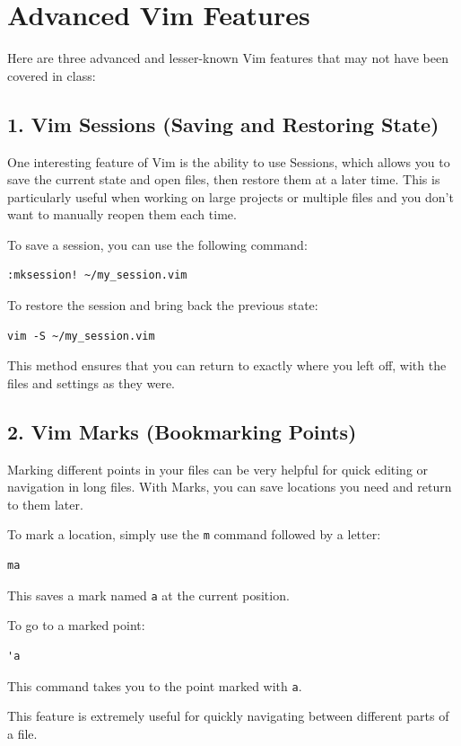 \documentclass{article}
\begin{document}
\section*{Advanced Vim Features}

Here are three advanced and lesser-known Vim features that may not have been covered in class:

\subsection*{1. Vim Sessions (Saving and Restoring State)}
One interesting feature of Vim is the ability to use Sessions, which allows you to save the current state and open files, then restore them at a later time. This is particularly useful when working on large projects or multiple files and you don't want to manually reopen them each time.

To save a session, you can use the following command:
\begin{verbatim}
:mksession! ~/my_session.vim
\end{verbatim}

To restore the session and bring back the previous state:
\begin{verbatim}
vim -S ~/my_session.vim
\end{verbatim}

This method ensures that you can return to exactly where you left off, with the files and settings as they were.

\subsection*{2. Vim Marks (Bookmarking Points)}
Marking different points in your files can be very helpful for quick editing or navigation in long files. With Marks, you can save locations you need and return to them later.

To mark a location, simply use the \texttt{m} command followed by a letter:
\begin{verbatim}
ma
\end{verbatim}
This saves a mark named \texttt{a} at the current position.

To go to a marked point:
\begin{verbatim}
'a
\end{verbatim}
This command takes you to the point marked with \texttt{a}.

This feature is extremely useful for quickly navigating between different parts of a file.
\end{document}

